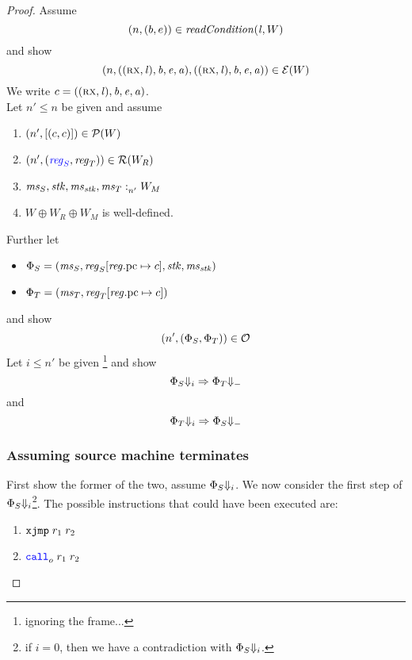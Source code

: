 \documentclass[a4paper]{article}
\begin{document}
\begin{proof}
  Assume
\[
  \npair{(b,e)}\in \readCond{\lin,W}
\]
and show
\[
\npair{((\rx,\lin),\baddr,\eaddr,\aaddr),
       ((\rx,\lin),\baddr,\eaddr,\aaddr)} \in \lre(W)
\]
We write $c=((\rx,\lin),\baddr,\eaddr,\aaddr)$.\\

Let $n' \leq n$ be given and assume
\begin{enumerate}
\item $\npair[n']{[(c,c)]} \in \lrp(W)$
\item $\npair[n']{\stpair{\reg}{\reg}} \in \lrr(W_R)$ \label{item:reg-ass}
\item $\memSat[n']{\ms_S,\stk,\ms_\stk,\ms_T}{W_M}$\label{item:mem-ass}
\item $W \oplus W_R \oplus W_M$ is well-defined.
\end{enumerate}
Further let
\begin{itemize}
\item $\Phi_S = (\ms_S,\reg_S\updReg{\pcreg}{c},\stk,\ms_\stk)$
\item $\Phi_T = (\ms_T,\reg_T\updReg{\pcreg}{c})$
\end{itemize}
and show
\[
  \npair[n']{(\Phi_S,\Phi_T)} \in \lro
\]
Let $i \leq n'$ be given \footnote{ignoring the frame...} and show
\[
  \Phi_S \term[i] \Rightarrow \Phi_T \term
\]
and 
\[
  \Phi_T \term[i] \Rightarrow \Phi_S \term
\]

\subsubsection*{Assuming source machine terminates}
First show the former of the two, assume $\Phi_S\term[i]$. We now consider the first step of $\Phi_S \term[i]$\footnote{if $i=0$, then we have a contradiction with $\Phi_S\term[i]$.}. 
The possible instructions that could have been executed are:
\begin{enumerate}
\item $\txjmp{r_1}{r_2}$
\item $\scall[o]{}{r_1}{r_2}$
\end{enumerate}



\end{proof}
\end{document}
